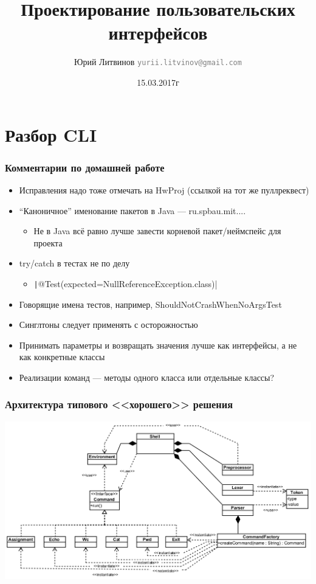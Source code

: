 \documentclass[xetex,mathserif,serif]{beamer}
\title{Проектирование пользовательских интерфейсов}
\author[Юрий Литвинов]{Юрий Литвинов \newline \textcolor{gray}{\small\texttt{yurii.litvinov@gmail.com}}}
\date{15.03.2017г}
\begin{document}
	
	\frame{\titlepage}

	\section{Разбор CLI}

	\begin{frame}
		\frametitle{Комментарии по домашней работе}
		\begin{itemize}
			\item Исправления надо тоже отмечать на HwProj (ссылкой на тот же пуллреквест)
			\item ``Каноничное'' именование пакетов в Java --- ru.spbau.mit....
			\begin{itemize}
				\item Не в Java всё равно лучше завести корневой пакет/неймспейс для проекта
			\end{itemize}
			\item try/catch в тестах не по делу
			\begin{itemize}
				\item \texttt|@Test(expected=NullReferenceException.class)|
			\end{itemize}
			\item Говорящие имена тестов, например, ShouldNotCrashWhenNoArgsTest
			\item Синглтоны следует применять с осторожностью
			\item Принимать параметры и возвращать значения лучше как интерфейсы, а не как конкретные классы
			\item Реализации команд --- методы одного класса или отдельные классы?
		\end{itemize}
	\end{frame}

	\begin{frame}
		\frametitle{Архитектура типового <<хорошего>> решения}
		\begin{center}
			\includegraphics[width=\textwidth]{cliArchitecture.png}
		\end{center}
	\end{frame}
\end{document}
